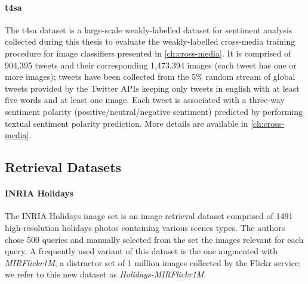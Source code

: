\paragraph{\acrfull{t4sa}~\cite{vadicamo2017cross}}
The \acrlong{t4sa} dataset is a large-scale weakly-labelled dataset for sentiment analysis collected during this thesis to evaluate the weakly-labelled cross-media training procedure for image classifiers presented in \ref{ch:cross-media}.
It is comprised of 904,395 tweets and their corresponding 1,473,394 images (each tweet has one or more images);
tweets have been collected from the 5\% random stream of global tweets provided by the Twitter APIs keeping only tweets in english with at least five words and at least one image.
Each tweet is associated with a three-way sentiment polarity (positive/neutral/negative sentiment) predicted by performing textual sentiment polarity prediction.
More details are available in \ref{ch:cross-media}.

\subsection{Retrieval Datasets}

\paragraph{INRIA Holidays~\cite{jegou2008hamming}}

The INRIA Holidays image set is an image retrieval dataset comprised of 1491 high-resolution holidays photos containing various scenes types.
The authors chose 500 queries and manually selected from the set the images relevant for each query.
A frequently used variant of this dataset is the one augmented with \emph{MIRFlickr1M}, a distractor set of 1 million images collected by the Flickr service;
we refer to this new dataset as \emph{Holidays-MIRFlickr1M}.

